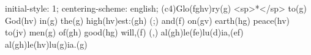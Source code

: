 initial-style: 1;
centering-scheme: english;
(c4)Glo(fghv)ry(g) <sp>*</sp> to(g) God(hv) in(g) the(g) high(hv)est:(gh) (;) and(f) on(gv) earth(hg) peace(hv) to(jv) men(g) of(gh) good(hg) will,(f) (,) al(gh)le(fe)lu(d)ia,(ef) al(gh)le(hv)lu(g)ia.(g)
